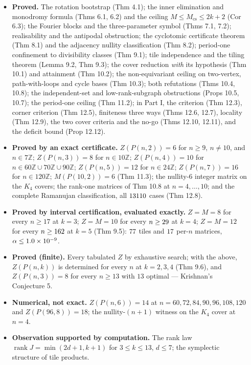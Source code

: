 \documentclass[11pt]{article}
\begin{document}
\begin{itemize}[leftmargin=*]
  \item \textbf{Proved.} The rotation bootstrap (Thm 4.1); the inner elimination and monodromy formula (Thms 6.1, 6.2) and the ceiling $M\le M_{\mathrm{cs}}\le2k+2$ (Cor 6.3); the Fourier blocks and the three-parameter symbol (Thms 7.1, 7.2); realisability and the antipodal obstruction; the cyclotomic certificate theorem (Thm 8.1) and the adjacency nullity classification (Thm 8.2); period-one confinement to divisibility classes (Thm 9.1); tile independence and the tiling theorem (Lemma 9.2, Thm 9.3); the cover reduction \emph{with} its hypothesis (Thm 10.1) and attainment (Thm 10.2); the non-equivariant ceiling on two-vertex, path-with-loops and cycle bases (Thm 10.3); both refutations (Thms 10.4, 10.8); the independent-set and low-rank-subgraph obstructions (Props 10.5, 10.7); the period-one ceiling (Thm 11.2); in Part I, the criterion (Thm 12.3), corner criterion (Thm 12.5), finiteness three ways (Thms 12.6, 12.7), locality (Thm 12.9), the two cover criteria and the no-go (Thms 12.10, 12.11), and the deficit bound (Prop 12.12).
  \item \textbf{Proved by an exact certificate.} $Z(P(n,2))=6$ for $n\ge9$, $n\ne10$, and $n\in7\mathbb Z$; $Z(P(n,3))=8$ for $n\in10\mathbb Z$; $Z(P(n,4))=10$ for $n\in60\mathbb Z\cup70\mathbb Z\cup90\mathbb Z$; $Z(P(n,5))=12$ for $n\in24\mathbb Z$; $Z(P(n,7))=16$ for $n\in120\mathbb Z$; $M(P(10,2))=6$ (Thm 11.3); the nullity-$6$ integer matrix on the $K_4$ covers; the rank-one matrices of Thm 10.8 at $n=4,\dots,10$; and the complete Ramanujan classification, all $13110$ cases (Thm 12.8).
  \item \textbf{Proved by interval certification, evaluated exactly.} $Z=M=8$ for every $n\ge17$ at $k=3$; $Z=M=10$ for every $n\ge29$ at $k=4$; $Z=M=12$ for every $n\ge162$ at $k=5$ (Thm 9.5): $77$ tiles and $17$ per-$n$ matrices, $\alpha\le1.0\times10^{-9}$.
  \item \textbf{Proved (finite).} Every tabulated $Z$ by exhaustive search; with the above, $Z(P(n,k))$ is determined for every $n$ at $k=2,3,4$ (Thm 9.6), and $Z(P(n,3))=8$ for every $n\ge13$ with $13$ optimal --- Krishnan's Conjecture 5.
  \item \textbf{Numerical, not exact.} $Z(P(n,6))=14$ at $n=60,72,84,90,96,108,120$ and $Z(P(96,8))=18$; the nullity-$(n+1)$ witness on the $K_4$ cover at $n=4$.
  \item \textbf{Observation supported by computation.} The rank law $\operatorname{rank}J=\min(2d+1,k+1)$ for $3\le k\le13$, $d\le7$; the symplectic structure of tile products.

\end{itemize}
\end{document}
